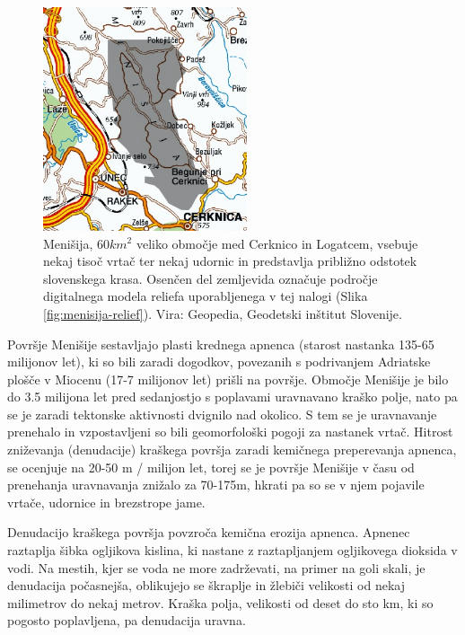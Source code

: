 \documentclass[a4paper, twoside, 12pt]{book}
\begin{document}
  \begin{figure}[h]
    \begin{center}
      \includegraphics[width=6cm]{slike/menisija-karta}
    \end{center}
    \caption{Menišija, $60 km^2$ veliko območje med Cerknico in Logatcem, vsebuje nekaj tisoč vrtač ter nekaj udornic in predstavlja približno odstotek slovenskega krasa. Osenčen del zemljevida označuje področje digitalnega modela reliefa uporabljenega v tej nalogi (Slika \ref{fig:menisija-relief}). Vira: Geopedia, Geodetski inštitut Slovenije.}
    \label{fig:menisija-karta}
  \end{figure}

  Površje Menišije sestavljajo plasti krednega apnenca (starost nastanka 135-65 milijonov let), ki so bili zaradi dogodkov, povezanih s podrivanjem Adriatske plošče v Miocenu (17-7 milijonov let) prišli na površje. Območje Menišije je bilo do 3.5 milijona let pred sedanjostjo s poplavami uravnavano kraško polje, nato pa se je zaradi tektonske aktivnosti dvignilo nad okolico. S tem se je uravnavanje prenehalo in vzpostavljeni so bili geomorfološki pogoji za nastanek vrtač.
Hitrost zniževanja (denudacije) kraškega površja zaradi kemičnega preperevanja apnenca, se ocenjuje na 20-50 m / milijon let, torej se je površje Menišije v času od prenehanja uravnavanja znižalo za 70-175m, hkrati pa so se v njem pojavile vrtače, udornice in brezstrope jame. \cite{Vrabec2006} \cite{Placer2010}

Denudacijo kraškega površja povzroča kemična erozija apnenca. Apnenec raztaplja šibka ogljikova kislina, ki nastane z raztapljanjem ogljikovega dioksida v vodi. Na mestih, kjer se voda ne more zadrževati, na primer na goli skali, je denudacija počasnejša, oblikujejo se škraplje in žlebiči velikosti od nekaj milimetrov do nekaj metrov. Kraška polja, velikosti od deset do sto km, ki so pogosto poplavljena, pa denudacija uravna.
\end{document}
